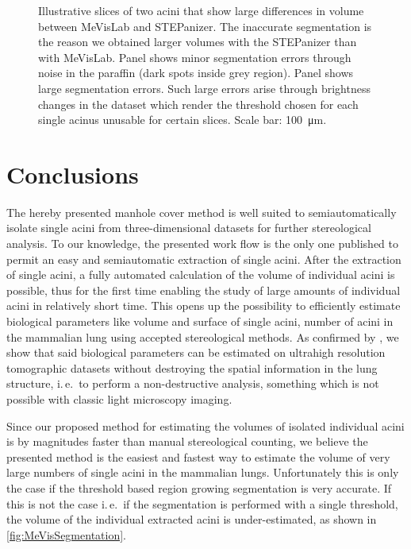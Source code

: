 \documentclass[a4paper,DIV=calc,abstract,english]{scrartcl}
\newcommand{\ie}{i.\,e.\ }
\begin{document}
\begin{figure}[htb]
{		\label{subfig:60e_acinus38}%
	}%
	\hfill%
	\caption{Illustrative slices of two acini that show large differences in volume between MeVisLab and STEPanizer.
		The inaccurate segmentation is the reason we obtained larger volumes with the STEPanizer than with MeVisLab.
		Panel \protect{} shows minor segmentation errors through noise in the paraffin (dark spots inside grey region).
		Panel \protect{} shows large segmentation errors.
		Such large errors arise through brightness changes in the dataset which render the threshold chosen for each single acinus unusable for certain slices.
		Scale bar: \SI{100}{\micro\meter}.}
	\label{fig:MeVisSegmentation}
\end{figure}

\section{Conclusions}
The hereby presented manhole cover method is well suited to semiautomatically isolate single acini from three-dimensional datasets for further stereological analysis.
To our knowledge, the presented work flow is the only one published to permit an easy and semiautomatic extraction of single acini.
After the extraction of single acini, a fully automated calculation of the volume of individual acini is possible, thus for the first time enabling the study of large amounts of individual acini in relatively short time.
This opens up the possibility to efficiently estimate biological parameters like volume and surface of single acini, number of acini in the mammalian lung using accepted stereological methods.
As confirmed by \cite{Vasilescu2012a}, we show that said biological parameters can be estimated on ultrahigh resolution tomographic datasets without destroying the spatial information in the lung structure, \ie to perform a non-destructive analysis, something which is not possible with classic light microscopy imaging.

Since our proposed method for estimating the volumes of isolated individual acini is by magnitudes faster than manual stereological counting, we believe the presented method is the easiest and fastest way to estimate the volume of very large numbers of single acini in the mammalian lungs.
Unfortunately this is only the case if the threshold based region growing segmentation is very accurate.
If this is not the case \ie if the segmentation is performed with a single threshold, the volume of the individual extracted acini is under-estimated, as shown in \autoref{fig:MeVisSegmentation}.
\end{document}
